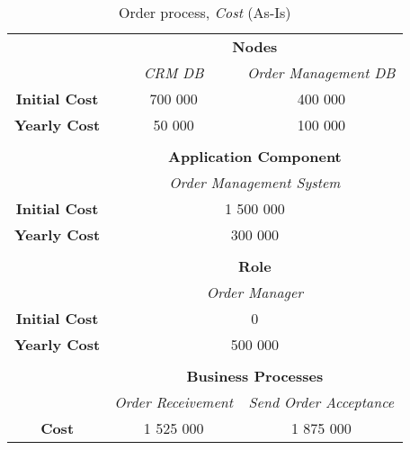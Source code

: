 \begin{table}[H]
	\centering
	\begin{tabular}{|c|c|p{2cm}|p{2.5cm}|p{2.5cm}|p{2.5cm}|}
		\cline{3-6}

		\multicolumn{2}{c}{} & \multicolumn{4}{|c|}{\textbf{Nodes}} \\ \cline{3-6}
		\multicolumn{2}{c|}{} & \multicolumn{2}{c|}{\textsl{CRM DB}} & \multicolumn{2}{c|}{\textsl{Order Management DB}} \\
		\hline
		\multicolumn{2}{|c|}{\textbf{Initial Cost}} & \multicolumn{2}{c|}{700 000} & \multicolumn{2}{c|}{400 000} \\ \hline
		\multicolumn{2}{|c|}{\textbf{Yearly Cost}}  & \multicolumn{2}{c|}{50 000} & \multicolumn{2}{c|}{100 000} \\ \hline
		
		\multicolumn{6}{c}{} \\ \cline{3-6}
		\multicolumn{2}{c}{} & \multicolumn{4}{|c|}{\textbf{Application Component}} \\ \cline{3-6}
		\multicolumn{2}{c|}{} & \multicolumn{4}{c|}{\textsl{Order Management System}} \\
		\hline
		\multicolumn{2}{|c|}{\textbf{Initial Cost}} & \multicolumn{4}{c|}{1 500 000}  \\ \hline
		\multicolumn{2}{|c|}{\textbf{Yearly Cost}}  & \multicolumn{4}{c|}{300 000}  \\ \hline

		
		\multicolumn{6}{c}{} \\ \cline{3-6}
		\multicolumn{2}{c}{} & \multicolumn{4}{|c|}{\textbf{Role}} \\ \cline{3-6}
		\multicolumn{2}{c|}{} & \multicolumn{4}{c|}{\textsl{Order Manager}} \\
		\hline
		\multicolumn{2}{|c|}{\textbf{Initial Cost}} & \multicolumn{4}{c|}{0}  \\ \hline
		\multicolumn{2}{|c|}{\textbf{Yearly Cost}}  & \multicolumn{4}{c|}{500 000}  \\ \hline


		\multicolumn{6}{c}{} \\ \cline{3-6}
		\multicolumn{2}{c}{} & \multicolumn{4}{|c|}{\textbf{Business Processes}} \\ \cline{3-6}
		\multicolumn{2}{c|}{} & \multicolumn{2}{c|}{\textsl{Order Receivement}} & \multicolumn{2}{c|}{\textsl{Send Order Acceptance}} \\
		\hline
		\multicolumn{2}{|c|}{\textbf{Cost}} & \multicolumn{2}{c|}{1 525 000} & \multicolumn{2}{c|}{1 875 000} \\ \hline

	\end{tabular}
\caption{Order process, \textsl{Cost} (As-Is)} 
\label{tab:order_as_is}
\end{table}